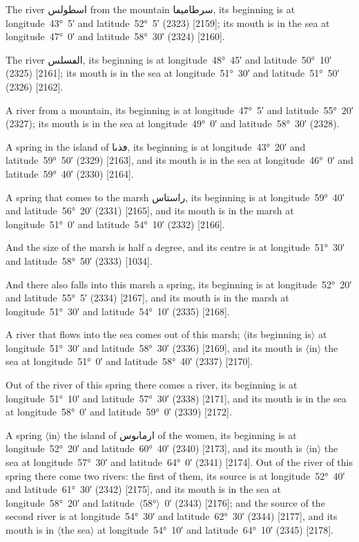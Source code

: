 \documentclass[11pt]{article}
\newcommand{\Pg}[1]{\marginpar{\footnotesize #1}}
\newcommand{\Ang}[1]{\ensuremath{#1}}
\begin{document}
The river \textarabic{اسطولس} from the mountain \textarabic{سرطاميڡا}, its beginning is at longitude~43°~5′ and latitude~52°~5′ (2323) [2159]; its mouth is in the sea at longitude~47°~0′ and latitude~58°~30′ (2324) [2160].

The river \textarabic{الڡسلس}, its beginning is at longitude~48°~45′ and latitude~50°~10′ (2325) [2161]; its mouth is in the sea at longitude~51°~30′ and latitude~51°~50′ (2326) [2162].

A river from a mountain, its beginning is at longitude~47°~5′ and latitude~55°~20′ (2327); its mouth is in the sea at longitude~49°~0′ and latitude~58°~30′ (2328).

A spring in the island of \textarabic{ڡذٮا}, its beginning is at longitude~43°~20′ and latitude~59°~50′ (2329) [2163], and its mouth is in the sea at longitude~46°~0′ and latitude~59°~40′ (2330) [2164].

A spring that comes to the marsh \textarabic{راستاس}, its beginning is at longitude~59°~40′ and latitude~56°~20′ (2331) [2165], and its mouth is in the marsh at longitude~51°~0′ and latitude~54°~10′ (2332) [2166].

And the size of the marsh is half a degree, and its centre is at longitude~51°~30′ and latitude~58°~50′ (2333) [1034].

And there also falls into this marsh a spring, its beginning is at longitude~52°~20′ and latitude~55°~5′ (2334) [2167], and its mouth is in the marsh at longitude~51°~30′ and latitude~54°~10′ (2335) [2168].

A river that flows into the sea comes out of this marsh; \Ang{\langle}its beginning is\Ang{\rangle} at longitude~51°~30′ and latitude~58°~30′ (2336) [2169], and its mouth is \Ang{\langle}in\Ang{\rangle} the sea at longitude~51°~0′ and latitude~58°~40′ (2337) [2170].

Out of the river of this spring there comes a river, its beginning is at longitude~51°~10′ and latitude~57°~30′ (2338) [2171], and its mouth is in the sea at longitude~58°~0′ and latitude~59°~0′ (2339) [2172].

\Pg{p. 154}A spring \Ang{\langle}in\Ang{\rangle} the island of \textarabic{ارماٮوس} of the women, its beginning is at longitude~52°~20′ and latitude~60°~40′ (2340) [2173], and its mouth is \Ang{\langle}in\Ang{\rangle} the sea at longitude~57°~30′ and latitude~64°~0′ (2341) [2174]. Out of the river of this spring there come two rivers: the first of them, its source is at longitude~52°~40′ and latitude~61°~30′ (2342) [2175], and its mouth is in the sea at longitude~58°~20′ and latitude~\Ang{\langle}58°\Ang{\rangle}~0′ (2343) [2176]; and the source of the second river is at longitude~54°~30′ and latitude~62°~30′ (2344) [2177], and its mouth is in \Ang{\langle}the sea\Ang{\rangle} at longitude~54°~10′ and latitude~64°~10′ (2345) [2178].
\end{document}

